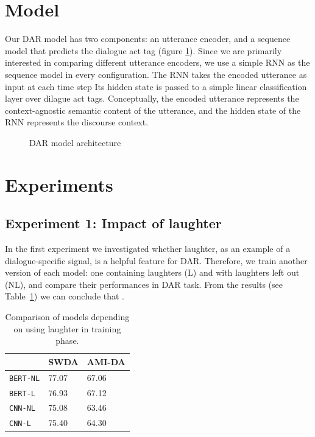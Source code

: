 \documentclass[11pt,a4paper]{article}
\begin{document}
  
\section{Model} %

Our DAR model has two components: an utterance encoder, and a sequence model that predicts the dialogue act tag (figure \ref{fig:model-architecture}).
Since we are primarily interested in comparing different utterance encoders, we use a simple RNN as the sequence model in every configuration. 
The RNN takes the encoded utterance as input at each time step
Its hidden state is passed to a simple linear classification layer over dilague act tags.
Conceptually, the encoded utterance represents the context-agnostic semantic content of the utterance, and the hidden state of the RNN represents the discourse context.

\begin{figure}
  
  \caption{DAR model architecture}
  \label{fig:model-architecture}
\end{figure}

\section{Experiments}
\subsection{Experiment 1: Impact of laughter}   %
In the first experiment we investigated whether laughter, as an example of a dialogue-specific signal, is a helpful feature for DAR.
Therefore, we train another version of each model: one containing laughters (L) and with laughters left out (NL), and compare their performances in DAR task.
From the results (see Table~\ref{tab:laughter}) we can conclude that .
\begin{table}
  \label{tab:laughter}
  \centering
  \begin{tabular}{@{}lll@{}}
    \toprule
                      & SWDA  & AMI-DA \\ \midrule
    \texttt{BERT-NL}  & 77.07 & 67.06       \\ 
    \texttt{BERT-L}   & 76.93 & 67.12       \\ \midrule
    \texttt{CNN-NL}   & 75.08 & 63.46        \\
    \texttt{CNN-L}    & 75.40 & 64.30        \\ \bottomrule
    
  \end{tabular}
  \caption{Comparison of models depending on using laughter in training phase.}
\end{table}
\end{document}
